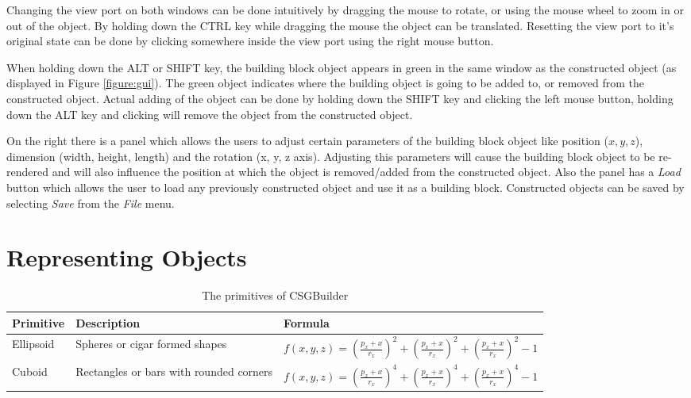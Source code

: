 \documentclass[a4wide,10pt,twocolumn]{article}
\begin{document}
Changing the view port on both windows can be done intuitively by dragging the mouse to rotate, or using the mouse wheel to zoom in or out of the object. By holding down the CTRL key while dragging the mouse the object can be translated. Resetting the view port to it's original state can be done by clicking somewhere inside the view port using the right mouse button.

When holding down the ALT or SHIFT key, the building block object appears in green in the same window as the constructed object (as displayed in Figure \ref{figure:gui}). The green object indicates where the building object is going to be added to, or removed from the constructed object. Actual adding of the object can be done by holding down the SHIFT key and clicking the left mouse button, holding down the ALT key and clicking will remove the object from the constructed object.

On the right there is a panel which allows the users to adjust certain parameters of the building block object like position ($x, y, z$), dimension (width, height, length) and the rotation (x, y, z axis). Adjusting this parameters will cause the building block object to be re-rendered and will also influence the position at which the object is removed/added from the constructed object. Also the panel has a \textit{Load} button which allows the user to load any previously constructed object and use it as a building block. Constructed objects can be saved by selecting \textit{Save} from the \textit{File} menu.

\section{Representing Objects}
\label{chapt:repobj}


    \begin{table}[t!]
        \begin{tabular}{|p{.1\linewidth}|p{.31\linewidth}|p{.50\linewidth}|}
            \hline
            \textbf{Primitive} & \textbf{Description} & \textbf{Formula}\\
            \hline
            \hline
             \vspace{0.1em}
             Ellipsoid &
             \vspace{0.1em}
             Spheres or cigar formed shapes &
             \vspace{0.1em}
             $f(x,y,z)=(\frac{p_x + x}{r_x})^2+(\frac{p_x + x}{r_x})^2+(\frac{p_x + x}{r_x})^2 - 1$\\[1.2em]
            \hline
             \vspace{0.1em}
             Cuboid &
             \vspace{0.1em}
             Rectangles or bars with rounded corners &
             \vspace{0.1em}
             $f(x,y,z)=(\frac{p_x + x}{r_x})^4+(\frac{p_x + x}{r_x})^4+(\frac{p_x + x}{r_x})^4 - 1$\\[1.2em]
            \hline
        \end{tabular}
        \caption{The primitives of CSGBuilder}
        \label{table:primitives}
    \end{table}
\end{document}
